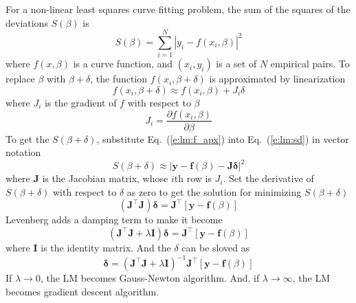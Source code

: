 \documentclass{turgon}
\begin{document}
For a non-linear least squares curve fitting problem, the sum of the squares of the deviations $S(\beta)$ is
\begin{equation}
    \label{e:lm:sd}
    S(\beta) = \sum_{i = 1}^N \left| y_i - f(x_i, \beta) \right|^2
\end{equation}
where $f(x, \beta)$ is a curve function, and $(x_i, y_i)$ is a set of $N$ empirical pairs. To replace $\beta$ with
$\beta + \delta$, the function $f(x_i, \beta + \delta)$ is approximated by linearization
\begin{equation}
    f(x_i, \beta + \delta) \approx f(x_i, \beta) + J_i \delta
    \label{e:lm:f_apx}
\end{equation}
where $J_i$ is the gradient of $f$ with respect to $\beta$
\begin{equation*}
    J_i = \frac{\partial f(x_i, \beta)}{\partial \beta}
\end{equation*}
To get the $S(\beta + \delta)$, substitute Eq.~(\ref{e:lm:f_apx}) into Eq.~(\ref{e:lm:sd}) in vector notation
\begin{equation*}
    S(\beta + \delta) \approx \left| \mathbf{y} - \mathbf{f}(\beta) - \mathbf{J} \mathbf{\delta} \right|^2
\end{equation*}
where $\mathbf{J}$ is the Jacobian matrix, whose $i$th row is $J_i$. Set the derivative of $S(\beta + \delta)$ with
respect to $\delta$ as zero to get the solution for minimizing $S(\beta + \delta)$
\begin{equation*}
    \left( \mathbf{J}^\top \mathbf{J} \right) \mathbf{\delta} =
    \mathbf{J}^\top \left[ \mathbf{y} - \mathbf{f}(\beta) \right]
\end{equation*}
Levenberg adds a damping term to make it become
\begin{equation*}
    \left( \mathbf{J}^\top \mathbf{J} + \lambda \mathbf{I} \right) \mathbf{\delta} =
    \mathbf{J}^\top \left[ \mathbf{y} - \mathbf{f}(\beta) \right]
\end{equation*}
where $\mathbf{I}$ is the identity matrix. And the $\delta$ can be sloved as
\begin{equation}
    \mathbf{\delta} =
    \left( \mathbf{J}^\top \mathbf{J} + \lambda \mathbf{I} \right)^{-1}
    \mathbf{J}^\top \left[ \mathbf{y} - \mathbf{f}(\beta) \right]
    \label{e:lm:sol}
\end{equation}
If $\lambda \rightarrow 0$, the LM becomes Gauss-Newton algorithm. And, if $\lambda \rightarrow \infty$, the LM becomes
gradient descent algorithm.
\end{document}
